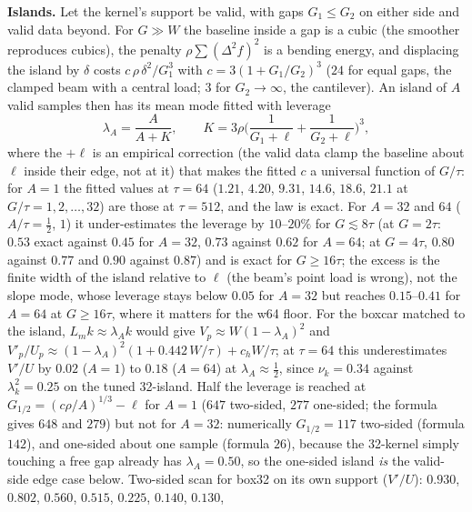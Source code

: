 \documentclass{article}
\numberwithin{equation}{section}   %
\begin{document}
{\bf Islands.}  Let the kernel's support be valid, with gaps $G_1 \le G_2$ on either side and valid data
beyond.  For $G \gg W$ the baseline inside a gap is a cubic (the smoother reproduces cubics), the penalty
$\rho\sum(\Delta^2 f)^2$ is a bending energy, and displacing the island by $\delta$ costs
$c\,\rho\,\delta^2/G_1^3$ with $c = 3(1 + G_1/G_2)^3$ ($24$ for equal gaps, the clamped beam with a central
load; $3$ for $G_2 \rightarrow \infty$, the cantilever).  An island of $A$ valid samples then has its mean
mode fitted with leverage
\begin{equation}
\lambda_A = \frac{A}{A + K}, \qquad K = 3\rho\Big(\frac{1}{G_1 + \ell} + \frac{1}{G_2 + \ell}\Big)^3 ,
\label{eq:ip_island}
\end{equation}
where the $+\ell$ is an empirical correction (the valid data clamp the baseline about $\ell$ inside
their edge, not at it) that makes the fitted $c$ a universal function of $G/\tau$: for $A = 1$ the fitted
values at $\tau = 64$ ($1.21$, $4.20$, $9.31$, $14.6$, $18.6$, $21.1$ at $G/\tau = 1, 2, \ldots, 32$) are
those at $\tau = 512$, and the law is exact.  For $A = 32$ and $64$ ($A/\tau = \tfrac12$, $1$) it
under-estimates the leverage by $10$--$20\%$ for $G \lesssim 8\tau$ (at $G = 2\tau$: $0.53$ exact against
$0.45$ for $A = 32$, $0.73$ against $0.62$ for $A = 64$; at $G = 4\tau$, $0.80$ against $0.77$ and $0.90$
against $0.87$) and is exact for $G \ge 16\tau$; the excess is the finite width of the island relative to
$\ell$ (the beam's point load is wrong), not the slope mode, whose leverage stays below $0.05$ for
$A = 32$ but reaches $0.15$--$0.41$ for $A = 64$ at $G \ge 16\tau$, where it matters for the w64 floor.
For the boxcar matched to the island, $L_mk \approx \lambda_A k$ would give $V_p \approx W(1 - \lambda_A)^2$
and $V'_p/U_p \approx (1 - \lambda_A)^2(1 + 0.442\,W/\tau) + c_h W/\tau$; at $\tau = 64$ this
underestimates $V'/U$ by $0.02$ ($A = 1$) to $0.18$ ($A = 64$) at $\lambda_A \approx \tfrac12$, since
$\nu_k = 0.34$ against $\lambda_k^2 = 0.25$ on the tuned 32-island.  Half the leverage is reached at
$G_{1/2} = (c\rho/A)^{1/3} - \ell$ for $A = 1$ ($647$ two-sided, $277$ one-sided; the formula gives $648$
and $279$) but not for $A = 32$: numerically $G_{1/2} = 117$ two-sided (formula $142$), and one-sided
about one sample (formula $26$), because the 32-kernel simply touching a free gap already has
$\lambda_A = 0.50$, so the one-sided island {\em is} the valid-side edge case below.  Two-sided scan
for box32 on its own support ($V'/U$): $0.930$, $0.802$, $0.560$, $0.515$, $0.225$, $0.140$, $0.130$,
\end{document}
